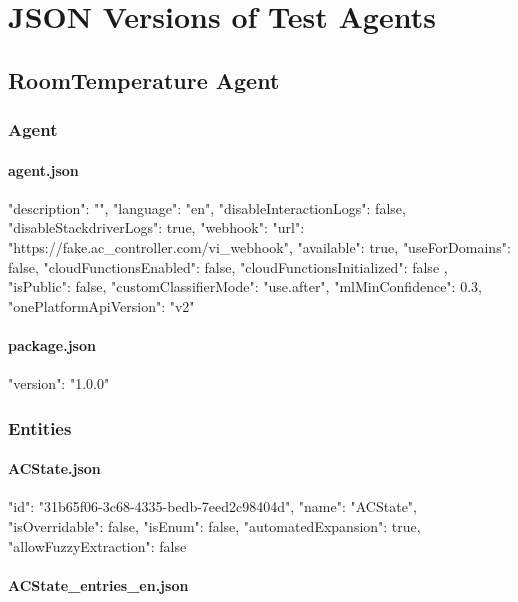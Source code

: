 \chapter{JSON Versions of Test Agents}
\section{RoomTemperature Agent}
\label{RoomTemperature Agent JSON}
\subsection{Agent}
\subsubsection{agent.json}
\begin{JSON}
{
  "description": "",
  "language": "en",
  "disableInteractionLogs": false,
  "disableStackdriverLogs": true,
  "webhook": {
    "url": "https://fake.ac_controller.com/vi_webhook",
    "available": true,
    "useForDomains": false,
    "cloudFunctionsEnabled": false,
    "cloudFunctionsInitialized": false
  },
  "isPublic": false,
  "customClassifierMode": "use.after",
  "mlMinConfidence": 0.3,
  "onePlatformApiVersion": "v2"
}
\end{JSON}
\subsubsection{package.json}
\begin{JSON}
{
  "version": "1.0.0"
}
\end{JSON}
\subsection{Entities}
\subsubsection{ACState.json}
\begin{JSON}
{
  "id": "31b65f06-3c68-4335-bedb-7eed2c98404d",
  "name": "ACState",
  "isOverridable": false,
  "isEnum": false,
  "automatedExpansion": true,
  "allowFuzzyExtraction": false
}	
\end{JSON}
\subsubsection{ACState\_entries\_en.json}
\begin{JSON}
\end{JSON}

